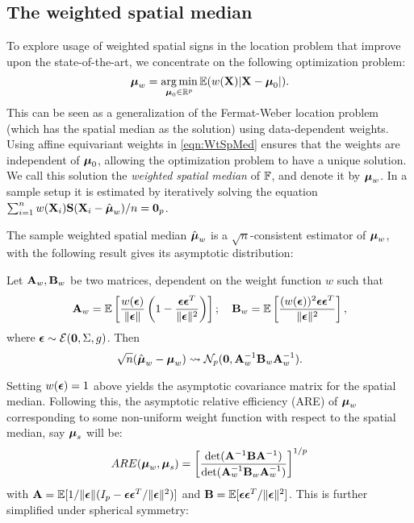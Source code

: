 \subsection{The weighted spatial median} 
To explore usage of weighted spatial signs in the location problem that improve upon the state-of-the-art, we concentrate on the following optimization problem:
%
\begin{equation}\label{eqn:WtSpMed}
{\boldsymbol{\mu}}_w = \operatorname*{arg\,min}_{{\boldsymbol{\mu}}_0 \in \mathbb{R}^p} {\mathbb{E}} ( w({\mathbf{X}}) | {\mathbf{X}} - {\boldsymbol{\mu}}_0 |).
\end{equation}
%
This can be seen as a generalization of the Fermat-Weber location problem (which has the spatial median \citep{brown83, Chaudhuri96} as the solution) using data-dependent weights. Using affine equivariant weights in \eqref{eqn:WtSpMed} ensures that the weights are independent of ${\boldsymbol{\mu}}_0$, allowing the optimization problem to have a unique solution. We call this solution the \textit{weighted spatial median} of ${\mathbb{F}}$, and denote it by ${\boldsymbol{\mu}}_w$. In a sample setup it is estimated by iteratively solving the equation $\sum_{i=1}^n w({\mathbf{X}}_i) {\mathbf{S}} ({\mathbf{X}}_i - \hat{{\boldsymbol{\mu}}}_w)/n = {\bf 0}_p$.

The sample weighted spatial median $\hat{{\boldsymbol{\mu}}}_w$ is a $\sqrt n$-consistent estimator of ${\boldsymbol{\mu}}_w$, with the following result gives its asymptotic distribution:
%
\begin{Theorem}
Let ${\mathbf{A}}_w, {\mathbf{B}}_w$ be two matrices, dependent on the weight function $w$ such that
%
$$
{\mathbf{A}}_w = {\mathbb{E}} \left[ \frac{w( {\boldsymbol{\epsilon}} ) }{\| {\boldsymbol{\epsilon}} \|} \left( 1 - \frac{{\boldsymbol{\epsilon}} {\boldsymbol{\epsilon}}^T}{\| {\boldsymbol{\epsilon}} \|^2} \right) \right];
\quad
{\mathbf{B}}_w = {\mathbb{E}} \left[ \frac{(w( {\boldsymbol{\epsilon}} ))^2 {\boldsymbol{\epsilon}} {\boldsymbol{\epsilon}}^T}{\| {\boldsymbol{\epsilon}} \|^2} \right],
$$
%
where ${\boldsymbol{\epsilon}} \sim \mathcal E({\bf 0}, \Sigma, g)$. Then
%
\begin{equation}
\sqrt n (\hat{{\boldsymbol{\mu}}}_w - {\boldsymbol{\mu}}_w) \leadsto \mathcal{N}_p ({\bf 0}, {\mathbf{A}}_w^{-1} {\mathbf{B}}_w {\mathbf{A}}_w^{-1}).
\end{equation}
\end{Theorem}
%

Setting $w({\boldsymbol{\epsilon}})=1$ above yields the asymptotic covariance matrix for the spatial median. Following this, the asymptotic relative efficiency (ARE) of ${\boldsymbol{\mu}}_w$ corresponding to some non-uniform weight function with respect to the spatial median, say ${\boldsymbol{\mu}}_s$ will be:
%
$$
ARE( {\boldsymbol{\mu}}_w, {\boldsymbol{\mu}}_s) = \left[ \frac{\text{det} ({\mathbf{A}}^{-1} {\mathbf{B}} {\mathbf{A}}^{-1})}{\text{det} ( {\mathbf{A}}_w^{-1} {\mathbf{B}}_w {\mathbf{A}}_w^{-1})} \right]^{1/p}
$$
%
with ${\mathbf{A}} = {\mathbb{E}} [ 1/ \| {\boldsymbol{\epsilon}} \| ( I_p - {\boldsymbol{\epsilon}} {\boldsymbol{\epsilon}}^T/ \| {\boldsymbol{\epsilon}} \|^2 ) ]$ and ${\mathbf{B}} = {\mathbb{E}} [ {\boldsymbol{\epsilon}} {\boldsymbol{\epsilon}}^T/ \| {\boldsymbol{\epsilon}} \|^2 ]$. This is further simplified under spherical symmetry:

